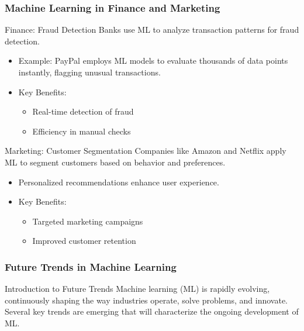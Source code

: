 \documentclass[aspectratio=169]{beamer}
\begin{document}
\begin{frame}[fragile]
    \frametitle{Machine Learning in Finance and Marketing}
    \begin{block}{Finance: Fraud Detection}
        Banks use ML to analyze transaction patterns for fraud detection.
        \begin{itemize}
            \item Example: PayPal employs ML models to evaluate thousands of data points instantly, flagging unusual transactions.
        \end{itemize}
    \end{block}
    \begin{itemize}
        \item Key Benefits:
            \begin{itemize}
                \item Real-time detection of fraud
                \item Efficiency in manual checks
            \end{itemize}
    \end{itemize}
    
    \begin{block}{Marketing: Customer Segmentation}
        Companies like Amazon and Netflix apply ML to segment customers based on behavior and preferences.
        \begin{itemize}
            \item Personalized recommendations enhance user experience.
        \end{itemize}
    \end{block}
    \begin{itemize}
        \item Key Benefits:
            \begin{itemize}
                \item Targeted marketing campaigns
                \item Improved customer retention
            \end{itemize}
    \end{itemize}
\end{frame}

\begin{frame}[fragile]
    \frametitle{Future Trends in Machine Learning}
    \begin{block}{Introduction to Future Trends}
        Machine learning (ML) is rapidly evolving, continuously shaping the way industries operate, solve problems, and innovate. Several key trends are emerging that will characterize the ongoing development of ML.
    \end{block}
\end{frame}
\end{document}
